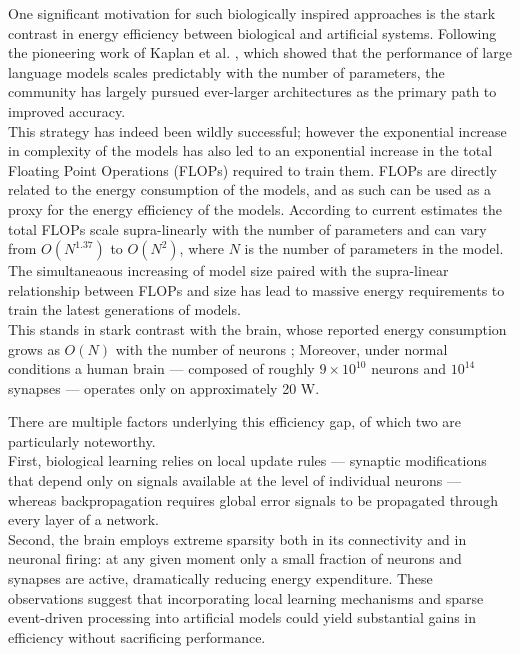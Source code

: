 \documentclass[a4paper,12pt]{report}
\begin{document}
One significant motivation for such biologically inspired approaches is the stark contrast in energy 
efficiency between biological and artificial systems. 
Following the pioneering work of Kaplan et al. \cite{kaplan2020scalinglawsneurallanguage}, which 
showed that the performance of large language models scales predictably with the number of parameters, 
the community has largely pursued ever-larger architectures as the primary path to improved 
accuracy. \\
This strategy has indeed been wildly successful; however the exponential increase in complexity of the 
models has also led to an exponential increase in the total Floating Point Operations (FLOPs) 
required to train them. FLOPs are directly related to the energy consumption of the models, 
and as such can be used as a proxy for the energy efficiency of the models. According to current 
estimates \cite{kaplan2020scalinglawsneurallanguage, hoffmann2022trainingcomputeoptimallargelanguage}
 the total FLOPs scale supra-linearly with the 
number of parameters and can vary from $O(N^{1.37})$ to $O(N^2)$, where $N$ is the number of 
parameters in the model. The simultaneaous increasing of model size paired with the supra-linear 
relationship between FLOPs and size has lead to massive energy requirements to train the latest 
generations of models. \\
This stands in stark contrast with the brain, whose reported energy consumption grows as 
$O(N)$ with the number of neurons \cite{10.1371/journal.pone.0017514}; Moreover, under normal 
conditions a human brain --- composed of roughly $9\times10^{10}$ neurons and $10^{14}$ synapses --- 
operates only on approximately 20 W. \cite{doi:10.1097/00004647-200110000-00001}
\vspace{0.5em}

There are multiple factors underlying this efficiency gap, of which two are particularly noteworthy. \\
First, biological learning relies on local update rules --- synaptic modifications that depend only 
on signals available at the level of individual neurons --- whereas backpropagation requires global 
error signals to be propagated through every layer of a network.
\cite{Xu2024} \\
Second, the brain employs extreme sparsity both in its connectivity and in neuronal firing: at any 
given moment only a small fraction of neurons and synapses are active, dramatically reducing energy 
expenditure. These observations suggest that incorporating local learning mechanisms and sparse 
event-driven processing into artificial models could yield substantial gains in efficiency without 
sacrificing performance.
\vspace{0.5em}
\end{document}
